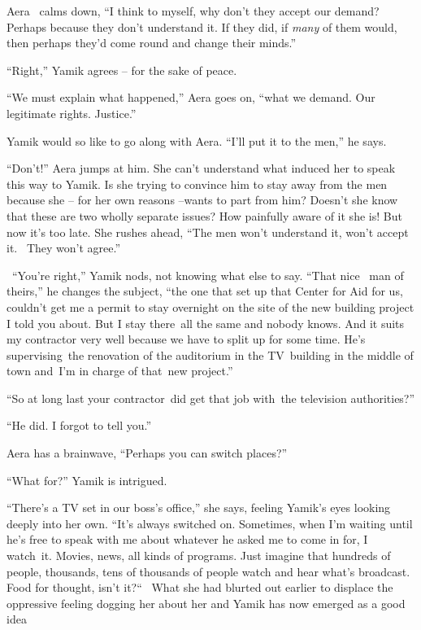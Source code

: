 \documentclass[twoside,11pt]{book}
\begin{document}
Aera \ calms down, ``I think to myself, why don't they accept our demand? Perhaps because they don't
understand it. If they did, if \textit{many} of them would, then perhaps they'd come round and change their
minds.''

``Right,'' Yamik agrees -- for the sake of peace.

``We must explain what happened,'' Aera goes on, ``what we demand. Our legitimate rights.
Justice.''

Yamik would so like to go along with Aera. ``I'll put it to the men,'' he says.

``Don't!'' Aera jumps at him. She can't understand what induced her to speak this way to
Yamik. Is she trying to convince him to stay away from the men because she -- for her own reasons --wants to part from
him? Doesn't she know that these are two wholly separate issues? How painfully aware of it she is! But now it's too
late. She rushes ahead, ``The men won't understand it, won't accept it.~ They won't agree.''

~``You're right,'' Yamik nods, not knowing what else to say. ``That nice \ man of
theirs,'' he changes the subject, ``the one that set up that Center for Aid for us, couldn't get me a permit to stay
overnight on the site of the new building project I told you about. But I stay there~all the same and nobody knows. And
it suits my contractor very well because we have to split up for some time. He's supervising~the renovation of the
auditorium in the TV~building in the middle of town and~I'm in charge of that~new project.''

``So at long last your contractor~did get that job with~the television authorities?''

``He did. I forgot to tell you.''

Aera has a brainwave, ``Perhaps you can switch places?''

``What for?'' Yamik is intrigued.

``There's a TV set in our boss's office,'' she says, feeling Yamik's eyes looking deeply into
her own. ``It's always switched on. Sometimes, when I'm waiting until he's free to speak with me about
whatever he asked me to come in for, I watch~it. Movies, news, all kinds of programs. Just imagine that hundreds of
people, thousands, tens of thousands of people watch and hear what's broadcast. Food for thought, isn't
it?``~ What she had blurted out earlier to displace the oppressive feeling dogging her about her and Yamik
has now emerged as a good idea
\end{document}
